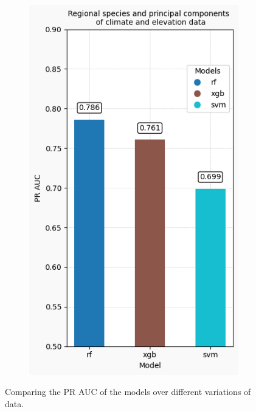 \documentclass{article}
\begin{document}
\begin{figure}[H]
\begin{subfigure}[b]{0.15\linewidth}
        \includegraphics[width=\linewidth]{Regional species and principal components of climate and elevation data.png}
        \caption{}
        \label{fig:regional_species_pca}
    \end{subfigure}
    \caption{Comparing the PR AUC of the models over different variations of data.}
    \label{fig:all_images_side_by_side}
\end{figure}
\end{document}
